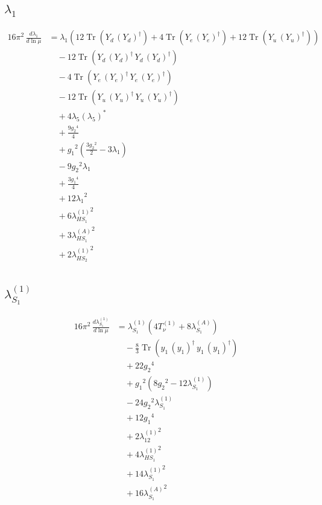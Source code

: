 \documentclass[10pt,a4paper]{article}
\begin{document}
\subsection*{$\lambda_1$}
\begin{align*}
16\pi^2\,\frac{d \lambda_1}{d\ln\mu} &={\lambda_1} (12 \operatorname{Tr}\!\left({Y_d}\,\left({Y_d}\right)^{\dagger}\right)+4 \operatorname{Tr}\!\left({Y_e}\,\left({Y_e}\right)^{\dagger}\right)+12 \operatorname{Tr}\!\left({Y_u}\,\left({Y_u}\right)^{\dagger}\right)) \\
&\quad -12 \operatorname{Tr}\!\left({Y_d}\,\left({Y_d}\right)^{\dagger}\,{Y_d}\,\left({Y_d}\right)^{\dagger}\right) \\
&\quad -4 \operatorname{Tr}\!\left({Y_e}\,\left({Y_e}\right)^{\dagger}\,{Y_e}\,\left({Y_e}\right)^{\dagger}\right) \\
&\quad -12 \operatorname{Tr}\!\left({Y_u}\,\left({Y_u}\right)^{\dagger}\,{Y_u}\,\left({Y_u}\right)^{\dagger}\right) \\
&\quad +4 {\lambda_5} \left({\lambda_5}\right)^{*} \\
&\quad +\frac{9 {g_2}^4}{4} \\
&\quad +{g_1}^2 \left(\frac{3 {g_2}^2}{2}-3 {\lambda_1}\right) \\
&\quad -9 {g_2}^2 {\lambda_1} \\
&\quad +\frac{3 {g_1}^4}{4} \\
&\quad +12 {\lambda_1}^2 \\
&\quad +6 {\lambda_{HS_1}^{(1)}}^2 \\
&\quad +3 {\lambda_{HS_1}^{(A)}}^2 \\
&\quad +2 {\lambda_{HS_2}^{(1)}}^2 \\
\end{align*}
\subsection*{$\lambda_{S_1}^{(1)}$}
\begin{align*}
16\pi^2\,\frac{d \lambda_{S_1}^{(1)}}{d\ln\mu} &={\lambda_{S_1}^{(1)}} (4 T_{\nu}^{(1)}+8 {\lambda_{S_1}^{(A)}}) \\
&\quad -\frac{8}{3} \operatorname{Tr}\!\left({y_1}\,\left({y_1}\right)^{\dagger}\,{y_1}\,\left({y_1}\right)^{\dagger}\right) \\
&\quad +22 {g_2}^4 \\
&\quad +{g_1}^2 \left(8 {g_2}^2-12 {\lambda_{S_1}^{(1)}}\right) \\
&\quad -24 {g_2}^2 {\lambda_{S_1}^{(1)}} \\
&\quad +12 {g_1}^4 \\
&\quad +2 {\lambda_{12}^{(1)}}^2 \\
&\quad +4 {\lambda_{HS_1}^{(1)}}^2 \\
&\quad +14 {\lambda_{S_1}^{(1)}}^2 \\
&\quad +16 {\lambda_{S_1}^{(A)}}^2 \\
\end{align*}
\end{document}
